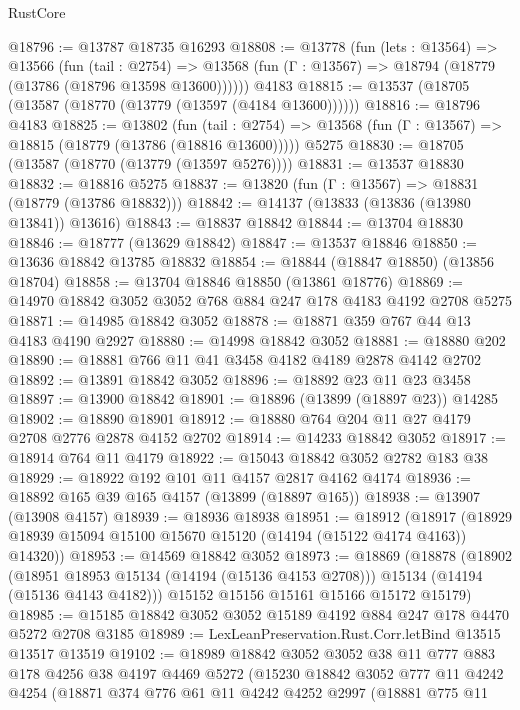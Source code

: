 \begin{lexlean}{RustCore}
\begin{coremodule}
@18796 := @13787 @18735 @16293
@18808 := @13778
    (fun (lets : @13564) =>
    @13566
      (fun (tail : @2754) =>
      @13568 (fun (Γ : @13567) => @18794 (@18779 (@13786 (@18796 @13598 @13600))))))
    @4183
@18815 := @13537 (@18705 (@13587 (@18770 (@13779 (@13597 (@4184 @13600))))))
@18816 := @18796 @4183
@18825 := @13802
    (fun (tail : @2754) => @13568 (fun (Γ : @13567) => @18815 (@18779 (@13786 (@18816 @13600)))))
    @5275
@18830 := @18705 (@13587 (@18770 (@13779 (@13597 @5276))))
@18831 := @13537 @18830
@18832 := @18816 @5275
@18837 := @13820 (fun (Γ : @13567) => @18831 (@18779 (@13786 @18832)))
@18842 := @14137 (@13833 (@13836 (@13980 @13841)) @13616)
@18843 := @18837 @18842
@18844 := @13704 @18830
@18846 := @18777 (@13629 @18842)
@18847 := @13537 @18846
@18850 := @13636 @18842 @13785 @18832
@18854 := @18844 (@18847 @18850) (@13856 @18704)
@18858 := @13704 @18846 @18850 (@13861 @18776)
@18869 := @14970 @18842 @3052 @3052 @768 @884 @247 @178 @4183 @4192 @2708 @5275
@18871 := @14985 @18842 @3052
@18878 := @18871 @359 @767 @44 @13 @4183 @4190 @2927
@18880 := @14998 @18842 @3052
@18881 := @18880 @202
@18890 := @18881 @766 @11 @41 @3458 @4182 @4189 @2878 @4142 @2702
@18892 := @13891 @18842 @3052
@18896 := @18892 @23 @11 @23 @3458
@18897 := @13900 @18842
@18901 := @18896 (@13899 (@18897 @23)) @14285
@18902 := @18890 @18901
@18912 := @18880 @764 @204 @11 @27 @4179 @2708 @2776 @2878 @4152 @2702
@18914 := @14233 @18842 @3052
@18917 := @18914 @764 @11 @4179
@18922 := @15043 @18842 @3052 @2782 @183 @38
@18929 := @18922 @192 @101 @11 @4157 @2817 @4162 @4174
@18936 := @18892 @165 @39 @165 @4157 (@13899 (@18897 @165))
@18938 := @13907 (@13908 @4157)
@18939 := @18936 @18938
@18951 := @18912
    (@18917 (@18929 @18939 @15094 @15100 @15670 @15120 (@14194 (@15122 @4174 @4163)) @14320))
@18953 := @14569 @18842 @3052
@18973 := @18869
    (@18878
      (@18902
        (@18951 @18953 @15134 (@14194 (@15136 @4153 @2708)))
        @15134
        (@14194 (@15136 @4143 @4182)))
      @15152
      @15156
      @15161
      @15166
      @15172
      @15179)
@18985 := @15185 @18842 @3052 @3052 @15189 @4192 @884 @247 @178 @4470 @5272 @2708 @3185
@18989 := LexLeanPreservation.Rust.Corr.letBind @13515 @13517 @13519
@19102 := @18989
    @18842
    @3052
    @3052
    @38
    @11
    @777
    @883
    @178
    @4256
    @38
    @4197
    @4469
    @5272
    (@15230
      @18842
      @3052
      @777
      @11
      @4242
      @4254
      (@18871
        @374
        @776
        @61
        @11
        @4242
        @4252
        @2997
        (@18881
          @775
          @11

\end{coremodule}
\end{lexlean}
